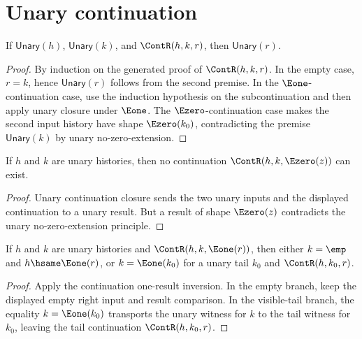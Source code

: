 \section{Unary continuation}

\begin{lemma}
If \(\mathsf{Unary}(h)\), \(\mathsf{Unary}(k)\), and \(\ContR(h,k,r)\), then \(\mathsf{Unary}(r)\).
\end{lemma}
\begin{proof}
By induction on the generated proof of \(\ContR(h,k,r)\). In the empty case, \(r=k\), hence \(\mathsf{Unary}(r)\) follows from the second premise. In the \(\Eone\)-continuation case, use the induction hypothesis on the subcontinuation and then apply unary closure under \(\Eone\). The \(\Ezero\)-continuation case makes the second input history have shape \(\Ezero(k_0)\), contradicting the premise \(\mathsf{Unary}(k)\) by unary no-zero-extension.
\end{proof}

\begin{lemma}
\label{lem:unary-cont-e0-result-absurd}
If $h$ and $k$ are unary histories, then no continuation
$\ContR(h,k,\Ezero(z))$ can exist.
\end{lemma}
\begin{proof}
Unary continuation closure sends the two unary inputs and the displayed
continuation to a unary result. But a result of shape $\Ezero(z)$ contradicts
the unary no-zero-extension principle.
\end{proof}

\begin{lemma}
\label{lem:unary-cont-e1-result-cases}
If $h$ and $k$ are unary histories and $\ContR(h,k,\Eone(r))$, then either
$k=\emp$ and $h\hsame\Eone(r)$, or $k=\Eone(k_0)$ for a unary tail $k_0$ and
$\ContR(h,k_0,r)$.
\end{lemma}
\begin{proof}
Apply the continuation one-result inversion. In the empty branch, keep the
displayed empty right input and result comparison. In the visible-tail branch,
the equality $k=\Eone(k_0)$ transports the unary witness for $k$ to the tail
witness for $k_0$, leaving the tail continuation $\ContR(h,k_0,r)$.
\end{proof}

